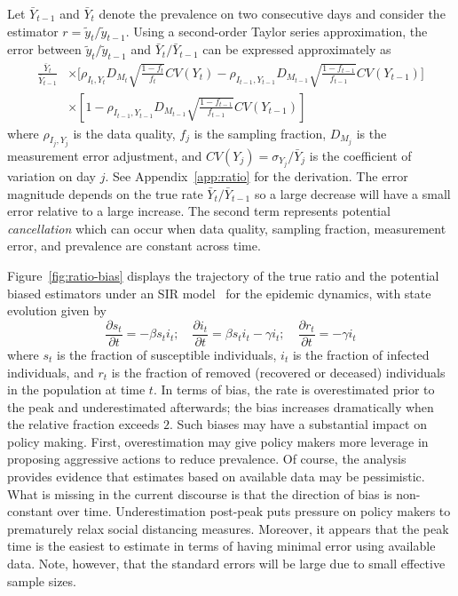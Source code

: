 \documentclass[11pt]{amsart}
\numberwithin{equation}{section}
\theoremstyle{plain}
\begin{document}
Let $\bar Y_{t-1}$ and $\bar Y_{t}$ denote the prevalence on two consecutive days and consider the estimator $r = \tilde y_t / \tilde y_{t-1}$.  Using a second-order Taylor series approximation, the error between ${\tilde y_t}/{\tilde y_{t-1}}$ and ${\bar Y_{t}}/{\bar Y_{t-1}}$ can be expressed approximately as
$$
\begin{aligned}
\frac{\bar Y_t}{\bar Y_{t-1}} &\times \bigg[ \rho_{I_t,Y_t} D_{M_t} \sqrt{\frac{1-f_t}{f_t}} CV (Y_t)  -\rho_{I_{t-1},Y_{t-1}} D_{M_{t-1}} \sqrt{\frac{1-f_{t-1}}{f_{t-1}}} CV (Y_{t-1}) \bigg] \\
&\times \left[ 1 - \rho_{I_{t-1},Y_{t-1}} D_{M_{t-1}} \sqrt{\frac{1-f_{t-1}}{f_{t-1}}} CV (Y_{t-1}) \right]
\end{aligned}
$$
where $\rho_{I_j, Y_j}$ is the data quality, $f_j$ is the sampling fraction, $D_{M_j}$ is the measurement error adjustment, and $CV(Y_j) = \sigma_{Y_j}/ \bar Y_j$ is the coefficient of variation on day $j$.  See Appendix~\ref{app:ratio} for the derivation. The error magnitude depends on the true rate $\bar Y_{t} / \bar Y_{t-1}$ so a large decrease will have a small error relative to a large increase. The second term represents potential \emph{cancellation} which can  occur when data quality, sampling fraction, measurement error, and prevalence are constant across time.

Figure~\ref{fig:ratio-bias} displays the trajectory of the true ratio and the potential biased estimators under an SIR model~\citep{Pastor2001,Newman2002,Parshani2010} for the epidemic dynamics, with state evolution given by
\begin{equation}
\label{eq:sir}
\frac{\partial s_t}{\partial t} = - \beta s_t i_t; \quad
\frac{\partial i_t}{\partial t} = \beta s_t i_t - \gamma i_t; \quad
\frac{\partial r_t}{\partial t} = - \gamma i_t
\end{equation}
where $s_t$ is the fraction of susceptible individuals, $i_t$ is the fraction of infected individuals, and $r_t$ is the fraction of removed (recovered or deceased) individuals in the population at time $t$.  In terms of bias, the rate is overestimated prior to the peak and underestimated afterwards; the bias increases dramatically when the relative fraction exceeds $2$.  Such biases may have a substantial impact on policy making.  First, overestimation may give policy makers more leverage in proposing aggressive actions to reduce prevalence.  Of course, the analysis provides evidence that estimates based on available data may be pessimistic. What is missing in the current discourse is that the direction of bias is non-constant over time.   Underestimation post-peak puts pressure on policy makers to prematurely relax social distancing measures.  Moreover, it appears that the peak time is the easiest to estimate in terms of having minimal error using available data.  Note, however, that the standard errors will be large due to small effective sample sizes.
\end{document}
